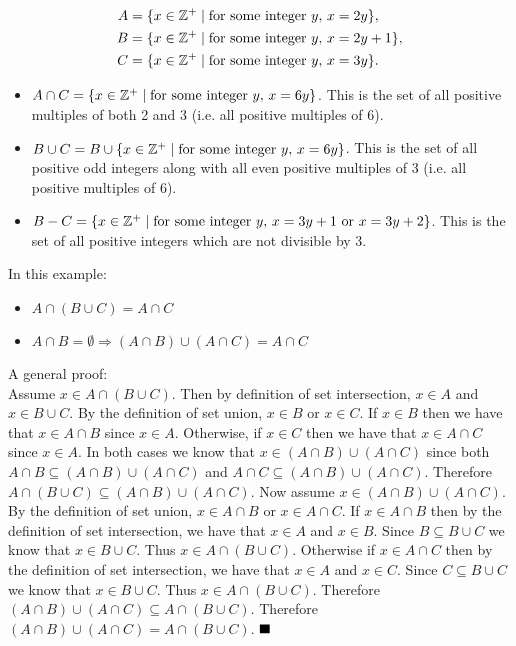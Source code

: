 \documentclass[12pt]{book}
\begin{document}
\begin{enumerate}
\begin{align*}
A &= \set{x \in \mathbb{Z^+} \mid \text{for some integer } y,\, x = 2y},\\
B &= \set{x \in \mathbb{Z^+} \mid \text{for some integer } y,\, x = 2y + 1},\\
C &= \set{x \in \mathbb{Z^+} \mid \text{for some integer } y,\, x = 3y}.
\end{align*}
	\begin{enumerate}
	{\begin{itemize}
		\item $A \cap C = \set{x \in \mathbb{Z^+} \mid \text{for some integer } y,\, x = 6y}$. This is the set of all positive multiples of both 2 and 3 (i.e. all positive multiples of 6).
		\item $B \cup C = B \cup \set{x \in \mathbb{Z^+} \mid \text{for some integer } y,\, x = 6y}$. This is the set of all positive odd integers along with all even positive multiples of 3 (i.e. all positive multiples of 6).
		\item $B - C = \set{x \in \mathbb{Z^+} \mid \text{for some integer } y,\, x = 3y + 1 \text{ or } x = 3y + 2}$. This is the set of all positive integers which are not divisible by 3.
	 \end{itemize}}
	{In this example:
	\begin{itemize}
		\item $A \cap (B \cup C) = A \cap C$
		\item $A \cap B = \emptyset \Rightarrow (A \cap B) \cup (A \cap C) = A \cap C$
	\end{itemize}
	A general proof:\\
	Assume $x \in A \cap (B \cup C)$. Then by definition of set intersection, $x \in A$ and $x \in B \cup C$. By the definition of set union, $x \in B$ or $x \in C$. If $x \in B$ then we have that $x \in A \cap B$ since $x \in A$. Otherwise, if $x \in C$ then we have that $x \in A \cap C$ since $x \in A$. In both cases we know that $x \in (A \cap B) \cup (A \cap C)$ since both $A \cap B \subseteq (A \cap B) \cup (A \cap C)$ and $A \cap C \subseteq (A \cap B) \cup (A \cap C)$. Therefore $A \cap (B \cup C) \subseteq (A \cap B) \cup (A \cap C)$. Now assume $x \in (A \cap B) \cup (A \cap C)$. By the definition of set union, $x \in A \cap B$ or $x \in A \cap C$. If $x \in A \cap B$ then by the definition of set intersection, we have that $x \in A$ and $x \in B$. Since $B \subseteq B \cup C$ we know that $x \in B \cup C$. Thus $x \in A \cap (B \cup C)$. Otherwise if $x \in A \cap C$ then by the definition of set intersection, we have that $x \in A$ and $x \in C$. Since $C \subseteq B \cup C$ we know that $x \in B \cup C$. Thus $x \in A \cap (B \cup C)$. Therefore $(A \cap B) \cup (A \cap C) \subseteq  A \cap (B \cup C)$. Therefore $(A \cap B) \cup (A \cap C) =  A \cap (B \cup C)$. $\qed$}

\end{enumerate}
\end{enumerate}
\end{document}
